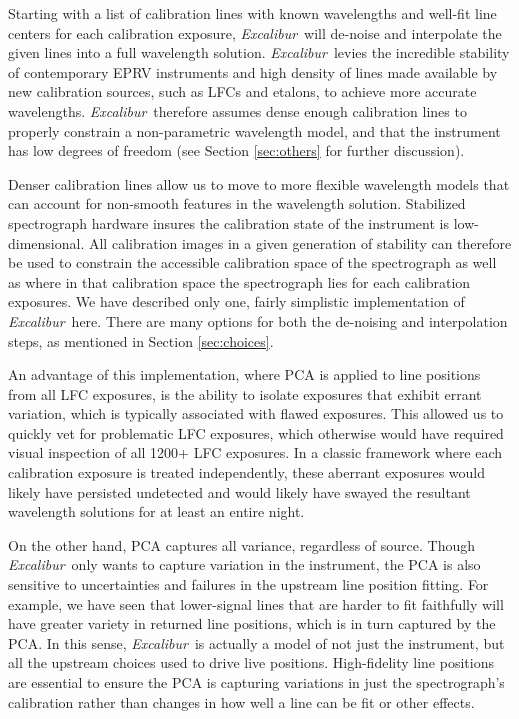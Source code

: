 \documentclass[modern]{aastex63}
\newcommand{\project}[1]{\textsl{#1}}
\newcommand{\name}{\project{Excalibur}}
\begin{document}
Starting with a list of calibration lines with known wavelengths and well-fit line centers for each calibration exposure, \name\ will de-noise and interpolate the given lines into a full wavelength solution.  \name\ levies the incredible stability of contemporary EPRV instruments and high density of lines made available by new calibration sources, such as LFCs and etalons, to achieve more accurate wavelengths.  \name\ therefore assumes dense enough calibration lines to properly constrain a non-parametric wavelength model, and that the instrument has low degrees of freedom (see Section \ref{sec:others} for further discussion).

Denser calibration lines allow us to move to more flexible wavelength models that can account for non-smooth features in the wavelength solution.  Stabilized spectrograph hardware insures the calibration state of the instrument is low-dimensional.  All calibration images in a given generation of stability can therefore be used to constrain the accessible calibration space of the spectrograph as well as where in that calibration space the spectrograph lies for each calibration exposures.  We have described only one, fairly simplistic implementation of \name\ here.  There are many options for both the de-noising and interpolation steps, as mentioned in Section \ref{sec:choices}.

An advantage of this implementation, where PCA is applied to line positions from all LFC exposures, is the ability to isolate exposures that exhibit errant variation, which is typically associated with flawed exposures.  This allowed us to quickly vet for problematic LFC exposures, which otherwise would have required visual inspection of all 1200+ LFC exposures.  In a classic framework where each calibration exposure is treated independently, these aberrant exposures would likely have persisted undetected and would likely have swayed the resultant wavelength solutions for at least an entire night.

On the other hand, PCA captures all variance, regardless of source.  Though \name\ only wants to capture variation in the instrument, the PCA is also sensitive to uncertainties and failures in the upstream line position fitting.  For example, we have seen that lower-signal lines that are harder to fit faithfully will have greater variety in returned line positions, which is in turn captured by the PCA.  In this sense, \name\ is actually a model of not just the instrument, but all the upstream choices used to drive live positions.  High-fidelity line positions are essential to ensure the PCA is capturing variations in just the spectrograph's calibration rather than changes in how well a line can be fit or other effects.
\end{document}
